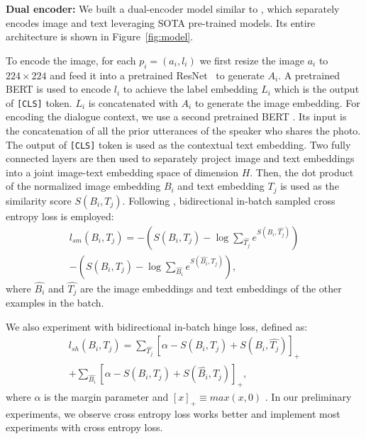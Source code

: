 \documentclass[11pt,a4paper]{article}
\begin{document}
\textbf{Dual encoder:}
We built a dual-encoder model similar to \citet{parekh2020crisscrossed, gillick2018endtoend}, which separately encodes image and text leveraging SOTA pre-trained models. Its entire architecture is shown in Figure~\ref{fig:model}.

To encode the image, for each $p_i = (a_i, l_i)$ we first resize the image $a_i$ to $224\times 224$ and feed it into a pretrained ResNet~\cite{he2016deep} to generate $A_i$. A pretrained BERT is used to encode $l_i$ to achieve the label embedding $L_i$ which is the output of \texttt{[CLS]} token. $L_i$ is concatenated with $A_i$ to generate the image embedding.
For encoding the dialogue context, we use a second pretrained BERT \cite{devlin2018bert}. Its input is the concatenation of all the prior utterances of the speaker who shares the photo. The output of \texttt{[CLS]} token is used as the contextual text embedding. 
 Two fully connected layers are then used to separately project image and text embeddings into a joint image-text embedding space of dimension $H$. Then, the dot product of the normalized image embedding $B_i$ and text embedding $T_j$ is used as the similarity score $S(B_i, T_j)$. Following \citet{young-etal-2014-image, gillick2018endtoend}, bidirectional in-batch sampled cross entropy loss is employed:
\begin{align*}
    l_{sm}(B_i, T_j) = - (S(B_i, T_j) - \log{\sum_{\hat{T_j}}{e^{S(B_i, \hat{T_j})}}}) \\ 
    - (S(B_i, T_j) - \log{\sum_{\hat{B_i}}{e^{S(\hat{B_i}, T_j)}}}),
\end{align*}
where $\hat{B_i}$ and $\hat{T_j}$ are the image embeddings and text embeddings of the other examples in the batch.

We also experiment with bidirectional in-batch hinge loss, defined as:
\begin{align*} 
l_{sh}(B_i, T_j) = \sum_{\hat{T_j}}[\alpha - S(B_i, T_j) + S(B_i, \hat{T_j})]_+\\ 
+ \sum_{\hat{B_i}}[\alpha - S(B_i, T_j) + S(\hat{B_i}, T_j)]_+,
\end{align*} 
where $\alpha$ is the margin parameter and $[x]_+ \equiv max(x, 0)$ . In our preliminary experiments, we observe
cross entropy loss works better and implement most experiments with cross entropy loss.
\end{document}
